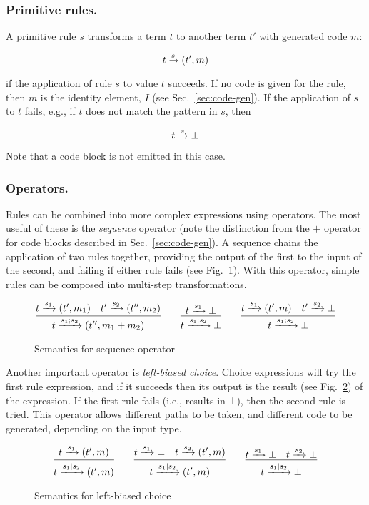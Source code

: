 \subsubsection{Primitive rules.}

A primitive rule $s$ transforms a term $t$ to another term $t'$
with generated code $m$:

\[
t \xrightarrow{s} (t',m)
\]

if the application of rule $s$ to value $t$ succeeds. If no code
is given for the rule, then $m$ is the identity element, $I$ (see
Sec.~\ref{sec:code-gen}). If the application of $s$ to $t$ fails,
e.g., if $t$ does not match the pattern in $s$, then

\[
t \xrightarrow{s} \bot
\]

Note that a code block is not emitted in this case.

\subsubsection{Operators.}

Rules can be combined into more complex expressions using
operators. The most useful of these is the \emph{sequence}
operator (note the distinction from the $+$ operator for code
blocks described in Sec.~\ref{sec:code-gen}). A sequence chains
the application of two rules together, providing the output of the
first to the input of the second, and failing if either rule fails
(see Fig.~\ref{fig:twig-seq}). With this operator, simple rules
can be composed into multi-step transformations.

\begin{figure}[ht]
\[
\infer
  {t \arr{s_1;s_2} (t'',m_1+m_2)}
  {t \arr{s_1} (t',m_1) \quad t' \arr{s_2} (t'',m_2)}
\qquad 
\infer
  {t \arr{s_1;s_2} \bot}
  {t \arr{s_1} \bot}
\qquad
\infer
  {t \arr{s_1;s_2} \bot}
  {t \arr{s_1} (t',m) \quad t' \arr{s_2} \bot}
\]
\caption{Semantics for sequence operator}
\label{fig:twig-seq}
\end{figure}

Another important operator is \emph{left-biased choice}. Choice
expressions will try the first rule expression, and if it succeeds
then its output is the result (see Fig.~\ref{fig:twig-choice}) of
the expression. If the first rule fails (i.e., results in $\bot$),
then the second rule is tried. This operator allows different
paths to be taken, and different code to be generated, depending
on the input type.

\begin{figure}[ht]
\[
\infer
  {t \arr{s_1|s_2} (t',m)}
  {t \arr{s_1} (t',m)}
\qquad 
\infer
  {t \arr{s_1|s_2} (t',m)}
  {t \arr{s_1} \bot \quad t \arr{s_2} (t',m)}
\qquad
\infer
  {t \arr{s_1|s_2} \bot}
  {t \arr{s_1} \bot \quad t \arr{s_2} \bot}
\]
\caption{Semantics for left-biased choice}
\label{fig:twig-choice}
\end{figure}

